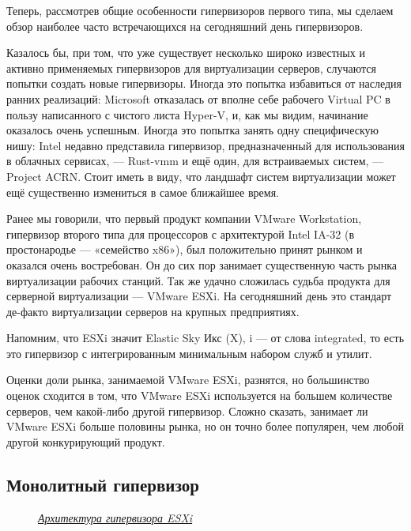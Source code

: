 \documentclass[14pt, a4paper]{article}
\begin{document}
Теперь, рассмотрев общие особенности гипервизоров первого типа, мы сделаем обзор наиболее
часто встречающихся на сегодняшний день гипервизоров.

Казалось бы, при том, что уже существует несколько широко известных и активно применяемых
гипервизоров для виртуализации серверов, случаются попытки создать новые гипервизоры. Иногда
это попытка избавиться от наследия ранних реализаций: Microsoft отказалась от вполне себе
рабочего Virtual PC в пользу написанного с чистого листа Hyper-V, и, как мы видим, начинание
оказалось очень успешным. Иногда это попытка занять одну специфическую нишу: Intel недавно
представила гипервизор, предназначенный для использования в облачных сервисах, — Rust-vmm и
ещё один, для встраиваемых систем, — Project ACRN. Стоит иметь в виду, что ландшафт систем
виртуализации может ещё существенно измениться в самое ближайшее время.

Ранее мы говорили, что первый продукт компании VMware Workstation, гипервизор второго типа для
процессоров с архитектурой Intel IA-32 (в простонародье — «семейство x86»), был положительно
принят рынком и оказался очень востребован. Он до сих пор занимает существенную часть рынка
виртуализации рабочих станций. Так же удачно сложилась судьба продукта для серверной
виртуализации — VMware ESXi. На сегодняшний день это стандарт де-факто виртуализации серверов
на крупных предприятиях.

Напомним, что ESXi значит Elastic Sky Икс (X), i — от слова integrated, то есть это гипервизор с
интегрированным минимальным набором служб и утилит.

Оценки доли рынка, занимаемой VMware ESXi, разнятся, но большинство оценок сходится в том, что
VMware ESXi используется на большем количестве серверов, чем какой-либо другой гипервизор.
Сложно сказать, занимает ли VMware ESXi больше половины рынка, но он точно более популярен,
чем любой другой конкурирующий продукт. \newpage

\subsection*{Монолитный гипервизор}

\begin{figure}[h]%
    \centering
    \caption*{\textit{\href{http://plone.4aero.com/Members/lmarzke/talks/vmug_esxi/esi_architecure_steamlined.png/image}{Архитектура гипервизора ESXi}}}
    \label{framework} %
\end{figure}
\end{document}
